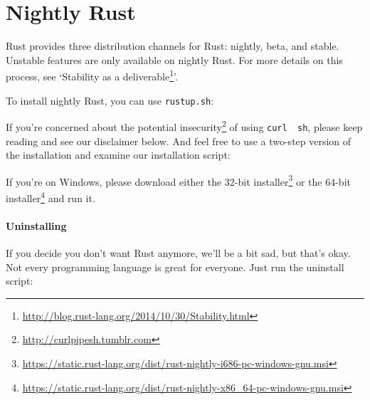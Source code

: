 \documentclass[a4paper,]{book}
\newenvironment{Shaded}{\begin{snugshade}}{\end{snugshade}}
\newcommand{\KeywordTok}[1]{\textcolor[rgb]{0.13,0.29,0.53}{\textbf{{#1}}}}
\newcommand{\NormalTok}[1]{{#1}}
\renewcommand{\href}[2]{#2\footnote{\url{#1}}}
\begin{document}
\hypertarget{sec--nightly-rust}{\chapter{Nightly
Rust}\label{sec--nightly-rust}}

Rust provides three distribution channels for Rust: nightly, beta, and
stable. Unstable features are only available on nightly Rust. For more
details on this process, see
`\href{http://blog.rust-lang.org/2014/10/30/Stability.html}{Stability as
a deliverable}'.

To install nightly Rust, you can use \texttt{rustup.sh}:

\begin{Shaded}
\end{Shaded}

If you're concerned about the
\href{http://curlpipesh.tumblr.com}{potential insecurity} of using
\texttt{curl\ \textbar{}\ sh}, please keep reading and see our
disclaimer below. And feel free to use a two-step version of the
installation and examine our installation script:

\begin{Shaded}
\end{Shaded}

If you're on Windows, please download either the
\href{https://static.rust-lang.org/dist/rust-nightly-i686-pc-windows-gnu.msi}{32-bit
installer} or the
\href{https://static.rust-lang.org/dist/rust-nightly-x86_64-pc-windows-gnu.msi}{64-bit
installer} and run it.

\subsubsection{Uninstalling}\label{uninstalling-1}

If you decide you don't want Rust anymore, we'll be a bit sad, but
that's okay. Not every programming language is great for everyone. Just
run the uninstall script:
\end{document}
